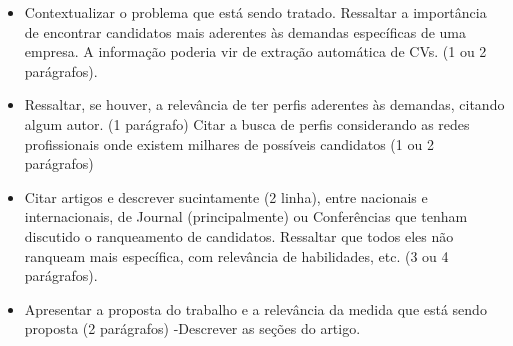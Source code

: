 \documentclass[preprint,12pt]{elsarticle}
\begin{document}
\begin{itemize}
\color{blue}
\item Contextualizar o problema que está sendo tratado. Ressaltar a importância de encontrar candidatos mais aderentes às demandas específicas de uma empresa. A informação poderia vir de extração automática de CVs. (1 ou 2 parágrafos). 
\item Ressaltar, se houver, a relevância de ter perfis aderentes às demandas, citando algum autor. (1 parágrafo) Citar a busca de perfis considerando as redes profissionais onde existem milhares de possíveis candidatos (1 ou 2 parágrafos)
\item Citar artigos e descrever sucintamente (2 linha), entre nacionais e internacionais, de Journal (principalmente) ou Conferências que tenham discutido o ranqueamento de candidatos. Ressaltar que todos eles não ranqueam mais específica, com relevância de habilidades, etc. (3 ou 4 parágrafos).
\item Apresentar a proposta do trabalho e a relevância da medida que está sendo proposta (2 parágrafos)
-Descrever as seções do artigo.

\end{itemize}
\end{document}
